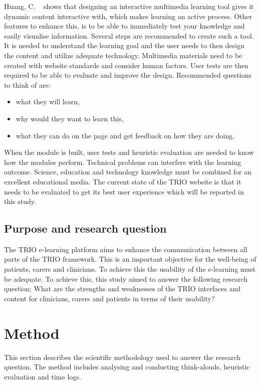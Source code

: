 \documentclass{sigchi}
\begin{document}
Huang, C. ~\cite{Huang2005} shows that designing an interactive multimedia learning tool gives it dynamic content interactive with, which makes learning an active process. Other features to enhance this, is to be able to immediately test your knowledge and easily visualise information. Several steps are recommended to create such a tool. It is needed to understand the learning goal and the user needs to then design the content and utilize adequate technology. Multimedia materials need to be created with website standards and consider human factors. User tests are then required to be able to evaluate and improve the design. Recommended questions to think of are:

\begin{itemize}
    \item what they will learn, 
    \item why would they want to learn this, 
    \item what they can do on the page and get feedback on how they are doing. 
\end{itemize}

When the module is built, user tests and heuristic evaluation are needed to know how the modules perform. Technical problems can interfere with the learning outcome. Science, education and technology knowledge must be combined for an excellent educational media. The current state of the TRIO website is that it needs to be evaluated to get its best user experience which will be reported in this study. 

\subsection{Purpose and research question}
The TRIO e-learning platform aims to enhance the communication between all parts of the TRIO framework. This is an important objective for the well-being of patients, carers and clinicians. To achieve this the usability of the e-learning must be adequate. To achieve this, this study aimed to answer the following research question; What are the strengths and weaknesses of the TRIO interfaces and content for clinicians, carers and patients in terms of their usability?

\section{Method}
This section describes the scientific methodology used to answer the research question. The method includes analysing and conducting think-alouds, heuristic evaluation and time logs.
\end{document}
